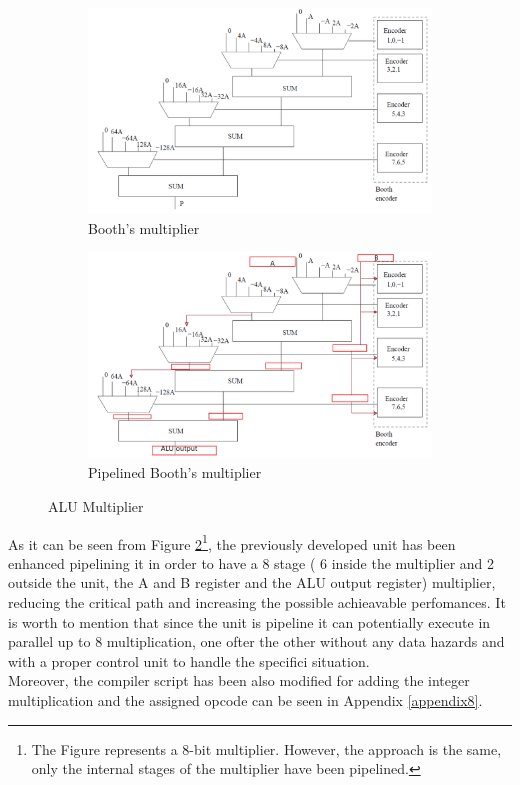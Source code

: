 \begin{figure}[!htbp]
\begin{subfigure}{.5\textwidth}
  \centering
  \includegraphics[scale=0.5,width=1\linewidth]{./chapters/figures/mult.PNG}  
  \caption{Booth's multiplier}
  \label{fig:alumula}
\end{subfigure}
\begin{subfigure}{.5\textwidth}
  \centering
  \includegraphics[scale=0.5,width=1\linewidth]{./chapters/figures/mult_pip.PNG}  
  \caption{Pipelined Booth's multiplier\protect\footnotemark[1]}
  \label{fig:alumulb}
\end{subfigure}
\caption{ALU Multiplier}
\label{fig:alumul}
\end{figure}
As it can be seen from Figure \ref{fig:alumulb}\footnote{The Figure represents a 8-bit multiplier. However, the approach is the same, only the internal stages of the multiplier have been pipelined.}, the previously developed unit has been enhanced pipelining it in order to have a 8 stage ( 6 inside the multiplier and 2 outside the unit, the A and B register and the ALU output register) multiplier, reducing the critical path and increasing the possible achieavable perfomances. It is worth to mention that since the unit is pipeline it can potentially execute in parallel up to 8 multiplication, one ofter the other without any data hazards and with a proper control unit to handle the specifici situation.\\
Moreover, the compiler script has been also modified for adding the integer multiplication and the assigned opcode can be seen in Appendix \ref{appendix8}.
